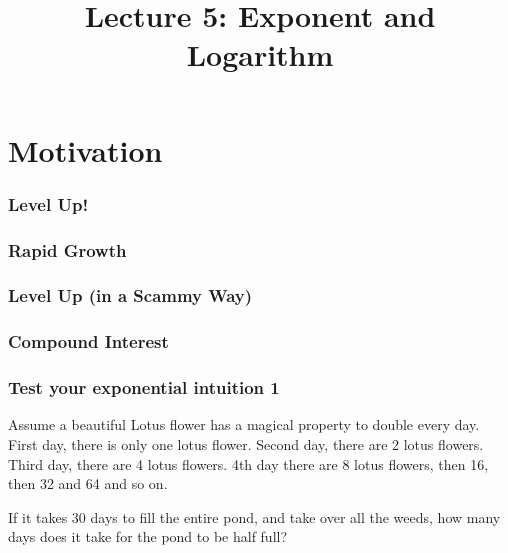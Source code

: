 \title{Lecture 5: Exponent and Logarithm}
\frame{\titlepage}

\section{Motivation}
\frame{\sectionpage}

\begin{frame}
  \frametitle{Level Up!}
\end{frame}

\begin{frame}
  \frametitle{Rapid Growth}
\end{frame}

\begin{frame}
  \frametitle{Level Up (in a Scammy Way)}
\end{frame}

\begin{frame}
  \frametitle{Compound Interest}
\end{frame}

\begin{frame}
\end{frame}

\begin{frame}
  \frametitle{Test your exponential intuition 1}
  \begin{alertblock}{}
    Assume a beautiful Lotus flower has a magical property to double every day. First day, there is only one lotus flower. Second day, there are 2 lotus flowers. Third day, there are 4 lotus flowers. 4th day there are 8 lotus flowers, then 16, then 32 and 64 and so on.
    \medskip

    If it takes 30 days to fill the entire pond, and take over all the weeds, how many days does it take for the pond to be half full?
  \end{alertblock}
\end{frame}

